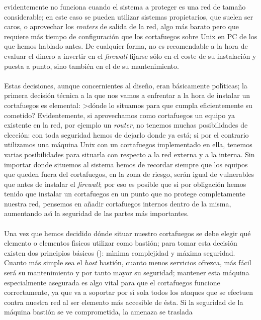 evidentemente no funciona cuando el sistema a proteger es una red de tama\~no
considerable; en este caso se pueden utilizar sistemas 
propietarios, que suelen ser caros, o aprovechar los {\it routers} de salida
de la red, algo m\'as barato pero que requiere m\'as tiempo de configuraci\'on
que los cortafuegos sobre Unix en PC de los que hemos hablado antes. De 
cualquier forma, no es recomendable a la hora de evaluar el dinero a invertir
en el {\it firewall} fijarse s\'olo en el coste de su instalaci\'on y puesta
a punto, sino tambi\'en en el de su mantenimiento.\\
\\Estas decisiones, aunque concernientes al dise\~no, eran b\'asicamente 
pol\'{\i}ticas; la primera decisi\'on t\'ecnica a la que nos vamos a enfrentar
a la hora de instalar un cortafuegos es elemental: >d\'onde lo situamos para
que cumpla eficientemente su cometido? Evidentemente, si aprovechamos como 
cortafuegos un equipo ya existente en la red, por ejemplo un {\it router}, no
tenemos muchas posibilidades de elecci\'on: con toda seguridad hemos de dejarlo
donde ya est\'a; si por el contrario utilizamos una m\'aquina Unix con un
cortafuegos implementado en ella, tenemos varias posibilidades para situarla
con respecto a la red externa y a la interna. Sin importar donde situemos al
sistema hemos de recordar siempre que los equipos que queden fuera del 
cortafuegos, en la zona de riesgo, ser\'an igual de vulnerables que antes de
instalar el {\it firewall}; por eso es posible que si por obligaci\'on hemos 
tenido que instalar un cortafuegos en un punto que no protege completamente
nuestra red, pensemos en a\~nadir cortafuegos internos dentro de la misma,
aumentando as\'{\i} la seguridad de las partes m\'as importantes.\\
\\Una vez que hemos decidido d\'onde situar nuestro cortafuegos se debe elegir
qu\'e elemento o elementos f\'{\i}sicos utilizar como basti\'on; para tomar
esta decisi\'on existen dos principios b\'asicos (\cite{kn:bre95}): m\'{\i}nima
complejidad y m\'axima seguridad. Cuanto m\'as simple sea el {\it host} 
basti\'on, cuanto menos servicios ofrezca, m\'as f\'acil ser\'a su 
mantenimiento y por tanto mayor su seguridad; mantener esta m\'aquina 
especialmente asegurada es algo vital para que el cortafuegos funcione 
correctamente, ya que va a soportar por s\'{\i} sola todos los ataques que se 
efectuen contra nuestra red al ser elemento m\'as accesible de \'esta. Si la
seguridad de la m\'aquina basti\'on se ve comprometida, la amenaza se traslada
